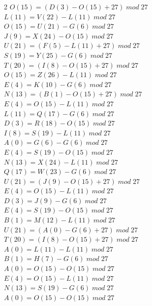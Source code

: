 \documentclass{article}
\begin{document}
\begin{enumerate}
\begin{multicols}{2}
$O (15) = (D (3) - O (15) + 27) \;  mod \; 27$\\
$L (11) = V (22) - L (11)   \;  mod \; 27$\\
$O (15) = U (21) - G (6) \;  mod \; 27 $\\ 
$J (9) = X (24) - O (15) \;  mod \; 27$\\
$U (21) = (F (5) - L (11) + 27)  \;  mod \; 27$\\
$S (19) = Y (25) - G (6) \;  mod \; 27 $\\ 
$T (20) = (I (8) - O (15) + 27) \;  mod \; 27$\\
$O (15) = Z (26) - L (11)  \;  mod \; 27$\\
$E (4) = K (10) - G (6) \;  mod \; 27 $\\ 
$N (13) = (B (1) - O (15) + 27) \;  mod \; 27$\\
$E (4) = O (15) - L (11)  \;  mod \; 27$\\
$L (11) = Q (17) - G (6) \;  mod \; 27 $\\ 
$D (3) = R (18) - O (15)\;  mod \; 27$\\
$I (8) = S (19) - L (11)  \;  mod \; 27$\\
$A (0) = G (6) - G (6) \;  mod \; 27 $\\ 
$E (4) = S (19) - O (15)\;  mod \; 27$\\
$N (13) = X (24) - L (11)  \;  mod \; 27$\\
$Q (17) = W (23) - G (6) \;  mod \; 27 $\\ 
$U (21) = (J (9) - O (15) + 27)\;  mod \; 27$\\
$E (4) = O (15) - L (11)  \;  mod \; 27$\\
$D (3) = J (9) - G (6) \;  mod \; 27 $\\ 
$E (4) = S (19) - O (15) \;  mod \; 27$\\
$B (1) = M (12) - L (11)  \;  mod \; 27$\\
$U (21) = (A (0) - G (6) + 27) \;  mod \; 27 $\\ 
$T (20) = (I (8) - O (15) + 27)\;  mod \; 27$\\
$A (0) = L (11) - L (11)  \;  mod \; 27$\\
$B (1) = H (7) - G (6) \;  mod \; 27 $\\ 
$A (0) = O (15) - O (15)\;  mod \; 27$\\
$E (4) = O (15) - L (11)  \;  mod \; 27$\\
$N (13) = S (19) - G (6) \;  mod \; 27 $\\ 
$A (0) = O (15) - O (15)\;  mod \; 27$\\

\end{multicols}
\end{enumerate}
\end{document}
